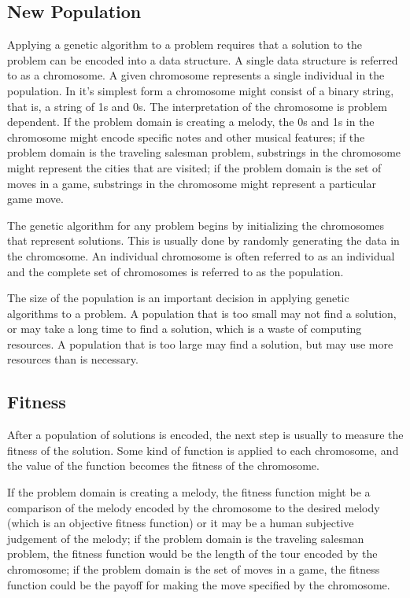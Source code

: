 \subsection{New Population}

Applying a genetic algorithm to a problem requires that a solution to the
problem can be encoded into a data structure. A single data structure is
referred to as a chromosome. A given chromosome represents a single individual
in the population. In it's simplest form a chromosome might consist of a binary
string, that is, a string of 1s and 0s. The interpretation of the chromosome is
problem dependent. If the problem domain is creating a melody, the 0s and 1s in
the chromosome might encode specific notes and other musical features; if the
problem domain is the traveling salesman problem, substrings in the chromosome
might represent the cities that are visited; if the problem domain is the set of
moves in a game, substrings in the chromosome might represent a particular game
move.

The genetic algorithm for any problem begins by initializing the chromosomes
that represent solutions. This is usually done by randomly generating the data
in the chromosome. An individual chromosome is often referred to as an
individual and the complete set of chromosomes is referred to as the population.

The size of the population is an important decision in applying genetic
algorithms to a problem. A population that is too small may not find a solution,
or may take a long time to find a solution, which is a waste of computing
resources. A population that is too large may find a solution, but may use more
resources than is necessary.

\subsection{Fitness}

After a population of solutions is encoded, the next step is usually to measure
the fitness of the solution. Some kind of function is applied to each
chromosome, and the value of the function becomes the fitness of the chromosome.

If the problem domain is creating a melody, the fitness function might be a
comparison of the melody encoded by the chromosome to the desired melody (which
is an objective fitness function) or it may be a human subjective judgement of
the melody; if the problem domain is the traveling salesman problem, the fitness
function would be the length of the tour encoded by the chromosome; if the
problem domain is the set of moves in a game, the fitness function could be the
payoff for making the move specified by the chromosome.

